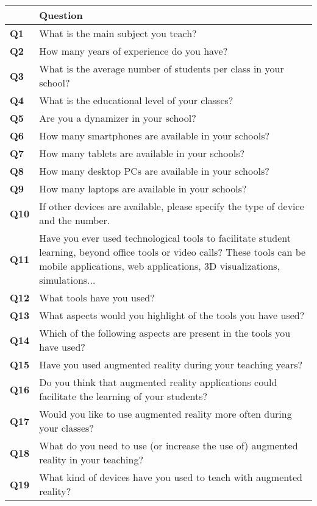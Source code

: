 \begin{longtable}{p{}>{\arraybackslash}p{}}
\toprule
 & Question\\
\midrule
\endhead
    \textbf{Q1} & What is the main subject you teach? \\
    \textbf{Q2} & How many years of experience do you have? \\
    \textbf{Q3} & What is the average number of students per class in your school? \\
    \textbf{Q4} & What is the educational level of your classes? \\
    \textbf{Q5} & Are you a dynamizer in your school? \\
    \textbf{Q6} & How many smartphones are available in your schools? \\
    \textbf{Q7} & How many tablets are available in your schools? \\
    \textbf{Q8} & How many desktop PCs are available in your schools? \\
    \textbf{Q9} & How many laptops are available in your schools? \\
    \textbf{Q10} & If other devices are available, please specify the type of device and the number. \\
    \textbf{Q11} & Have you ever used technological tools to facilitate student learning,
beyond office tools or video calls? These tools can be mobile applications, web
applications, 3D visualizations, simulations... \\
    \textbf{Q12} & What tools have you used? \\
    \textbf{Q13} & What aspects would you highlight of the tools you have used? \\
    \textbf{Q14} & Which of the following aspects are present in the tools you have used? \\
    \textbf{Q15} & Have you used augmented reality during your teaching years? \\
    \textbf{Q16} & Do you think that augmented reality applications could facilitate the learning of your students? \\
    \textbf{Q17} & Would you like to use augmented reality more often during your classes? \\
    \textbf{Q18} & What do you need to use (or increase the use of) augmented reality in your teaching? \\
    \textbf{Q19} & What kind of devices have you used to teach with augmented reality? \\

\end{longtable}
